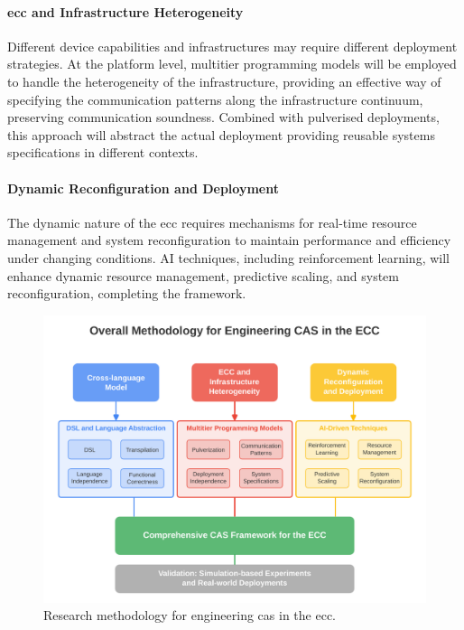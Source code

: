 \documentclass[runningheads]{llncs}
\begin{document}
\paragraph{\ac{ecc} and Infrastructure Heterogeneity}
    Different device capabilities and infrastructures may require different deployment strategies.
    At the platform level,
    multitier programming models will be employed to handle the heterogeneity of the infrastructure,
    providing an effective way of specifying the communication patterns along the infrastructure continuum,
    preserving communication soundness.
    Combined with pulverised deployments,
    this approach will abstract the actual deployment providing reusable systems specifications in different contexts.
\paragraph{Dynamic Reconfiguration and Deployment}
    The dynamic nature of the \ac{ecc} requires mechanisms for real-time resource management and system reconfiguration to maintain performance and efficiency under changing conditions.
    AI techniques,
    including reinforcement learning,
    will enhance dynamic resource management,
    predictive scaling,
    and system reconfiguration,
    completing the framework.

\begin{figure}[ht]
    \centering
    \includegraphics[width=\textwidth]{figures/methodology-overview.pdf}
    \caption{Research methodology for engineering \ac{cas} in the \ac{ecc}.}
    \label{fig:methodology}
\end{figure}
\end{document}
